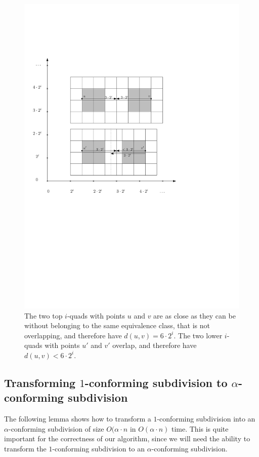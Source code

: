 \begin{figure}[H]
	\centering
	\includegraphics[width=\textwidth]{figures/lessthan6i.pdf}
	\caption{The two top $i$-quads with points $u$ and $v$ are as close as they can be without 
    		 belonging to the same equivalence class, that is not overlapping, and therefore have 
             $d(u,v) = 6 \cdot 2^i$. The two lower $i$-quads with points $u'$ and $v'$ overlap, and 
             therefore have $d(u,v) < 6 \cdot 2^i$.}
	\label{fig:lessthan6i}
\end{figure}

\subsection{Transforming $1$-conforming subdivision to $\alpha$-conforming subdivision}

The following lemma shows how to transform a $1$-conforming subdivision into an $\alpha$-conforming 
subdivision of size $O(\alpha\cdot n$ in $O(\alpha\cdot n)$ time. This is quite important for the 
correctness of our algorithm, since we will need the ability to transform the $1$-conforming 
subdivision to an $\alpha$-conforming subdivision.

